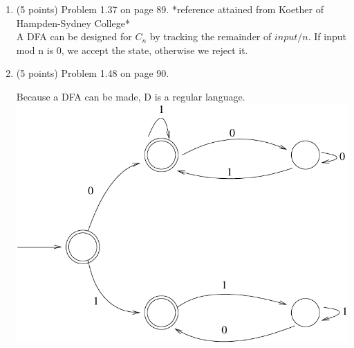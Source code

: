 \documentclass[11pt]{article}
\begin{document}
\begin{enumerate}
 \item (5 points) Problem 1.37 on page 89. *reference attained from Koether of Hampden-Sydney College*\\
  A DFA can be designed for $C_n$ by tracking the remainder of $input/n$. If input mod n is 0, we accept the state, 
  otherwise we reject it.


 \item (5 points) Problem 1.48 on page 90. 
  \begin{center}
    Because a DFA can be made, D is a regular language.
    \includegraphics[scale=.9] {fig6.pdf}
  \end{center}
\end{enumerate}
\end{document}
